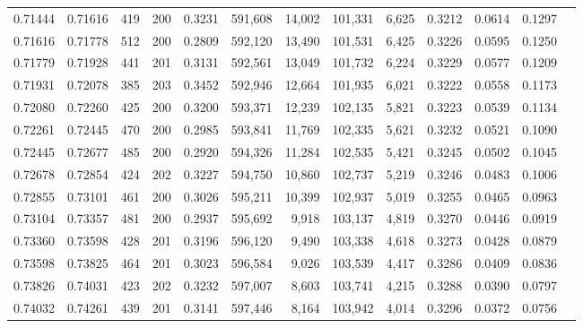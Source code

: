 \begin{tabular}{rrrrrrrrrrrrr}
0.71444 & 0.71616 &   419 & 200 &                                     0.3231 & 591,608 &  14,002 & 101,331 &   6,625 & 0.3212 & 0.0614 & 0.1297 \\
0.71616 & 0.71778 &   512 & 200 &                                     0.2809 & 592,120 &  13,490 & 101,531 &   6,425 & 0.3226 & 0.0595 & 0.1250 \\
0.71779 & 0.71928 &   441 & 201 &                                     0.3131 & 592,561 &  13,049 & 101,732 &   6,224 & 0.3229 & 0.0577 & 0.1209 \\
0.71931 & 0.72078 &   385 & 203 &                                     0.3452 & 592,946 &  12,664 & 101,935 &   6,021 & 0.3222 & 0.0558 & 0.1173 \\
0.72080 & 0.72260 &   425 & 200 &                                     0.3200 & 593,371 &  12,239 & 102,135 &   5,821 & 0.3223 & 0.0539 & 0.1134 \\
0.72261 & 0.72445 &   470 & 200 &                                     0.2985 & 593,841 &  11,769 & 102,335 &   5,621 & 0.3232 & 0.0521 & 0.1090 \\
0.72445 & 0.72677 &   485 & 200 &                                     0.2920 & 594,326 &  11,284 & 102,535 &   5,421 & 0.3245 & 0.0502 & 0.1045 \\
0.72678 & 0.72854 &   424 & 202 &                                     0.3227 & 594,750 &  10,860 & 102,737 &   5,219 & 0.3246 & 0.0483 & 0.1006 \\
0.72855 & 0.73101 &   461 & 200 &                                     0.3026 & 595,211 &  10,399 & 102,937 &   5,019 & 0.3255 & 0.0465 & 0.0963 \\
0.73104 & 0.73357 &   481 & 200 &                                     0.2937 & 595,692 &   9,918 & 103,137 &   4,819 & 0.3270 & 0.0446 & 0.0919 \\
0.73360 & 0.73598 &   428 & 201 &                                     0.3196 & 596,120 &   9,490 & 103,338 &   4,618 & 0.3273 & 0.0428 & 0.0879 \\
0.73598 & 0.73825 &   464 & 201 &                                     0.3023 & 596,584 &   9,026 & 103,539 &   4,417 & 0.3286 & 0.0409 & 0.0836 \\
0.73826 & 0.74031 &   423 & 202 &                                     0.3232 & 597,007 &   8,603 & 103,741 &   4,215 & 0.3288 & 0.0390 & 0.0797 \\
0.74032 & 0.74261 &   439 & 201 &                                     0.3141 & 597,446 &   8,164 & 103,942 &   4,014 & 0.3296 & 0.0372 & 0.0756 \\

\end{tabular}
